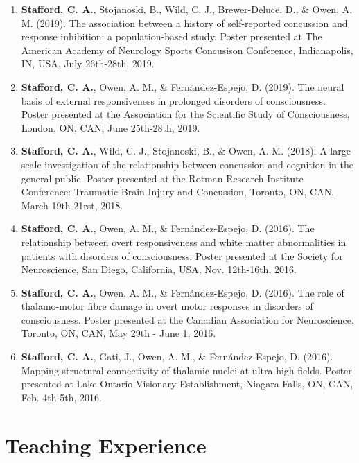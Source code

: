 \documentclass[letterpaper]{twentysecondcv} %
\begin{document}
\begin{enumerate}
	\item \textbf{Stafford, C. A.}, Stojanoski, B., Wild, C. J., Brewer-Deluce, D., \& Owen, A. M. (2019). The association between a history of self-reported concussion and response inhibition: a population-based study. Poster presented at The American Academy of Neurology Sports Concusison Conference, Indianapolis, IN, USA, July 26th-28th, 2019.
	\item \textbf{Stafford, C. A.}, Owen, A. M., \& Fern\'andez-Espejo, D. (2019). The neural basis of external responsiveness in prolonged disorders of consciousness. Poster presented at the Association for the Scientific Study of Consciousness, London, ON, CAN, June 25th-28th, 2019.
	\item \textbf{Stafford, C. A.}, Wild, C. J., Stojanoski, B., \& Owen, A. M. (2018). A large-scale investigation of the relationship between concussion and cognition in the general public. Poster presented at the Rotman Research Institute Conference: Traumatic Brain Injury and Concussion, Toronto, ON, CAN, March 19th-21rst, 2018.
	\item \textbf{Stafford, C. A.}, Owen, A. M., \& Fern\'andez-Espejo, D. (2016). The relationship between overt responsiveness and white matter abnormalities in patients with disorders of consciousness. Poster presented at the Society for Neuroscience, San Diego, California, USA, Nov. 12th-16th, 2016.
	\item \textbf{Stafford, C. A.}, Owen, A. M., \& Fern\'andez-Espejo, D. (2016). The role of thalamo-motor fibre damage in overt motor responses in disorders of consciousness. Poster presented at the Canadian Association for Neuroscience, Toronto, ON, CAN, May 29th - June 1, 2016.
	\item \textbf{Stafford, C. A.}, Gati, J., Owen, A. M., \& Fern\'andez-Espejo, D. (2016). Mapping structural connectivity of thalamic nuclei at ultra-high fields. Poster presented at Lake Ontario Visionary Establishment, Niagara Falls, ON, CAN, Feb. 4th-5th, 2016.
\end{enumerate}



\section{Teaching Experience}
\end{document}
